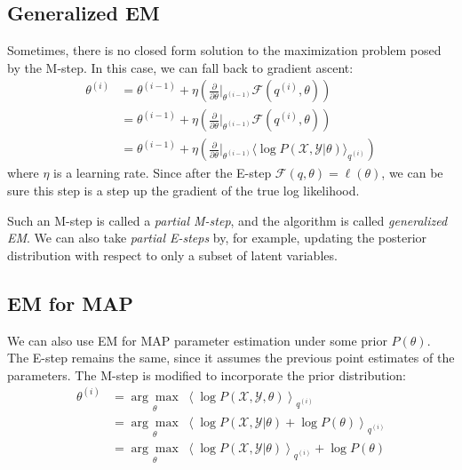 \documentclass[a4paper]{article}
\begin{document}
\subsection{Generalized EM}
Sometimes, there is no closed form solution to the maximization problem posed by the M-step. In this case, we can fall back to gradient ascent:
\begin{align*}
\theta^{(i)} &= \theta^{(i-1)} + \eta\left(\frac{\partial}{\partial \theta}\Bigr|_{\theta^{(i-1)}}\mathcal{F}(q^{(i)},\theta)\right) \\
&= \theta^{(i-1)} + \eta\left(\frac{\partial}{\partial \theta}\Bigr|_{\theta^{(i-1)}}\mathcal{F}(q^{(i)},\theta)\right) \\
&= \theta^{(i-1)} + \eta\left(\frac{\partial}{\partial \theta}\Bigr|_{\theta^{(i-1)}}\langle\log P(\mathcal{X},\mathcal{Y}|\theta)\rangle_{q^{(i)}}\right)
\end{align*}
where $\eta$ is a learning rate. Since after the E-step $\mathcal{F}(q,\theta) = \ell(\theta)$, we can be sure this step is a step up the gradient of the true log likelihood.

Such an M-step is called a \emph{partial M-step}, and the algorithm is called \emph{generalized EM}. We can also take \emph{partial E-steps} by, for example, updating the posterior distribution with respect to only a subset of latent variables.

\subsection{EM for MAP}
We can also use EM for MAP parameter estimation under some prior $P(\theta)$. The E-step remains the same, since it assumes the previous point estimates of the parameters. The M-step is modified to incorporate the prior distribution:
\begin{align*}
\theta^{(i)} &= \underset{\theta}{\arg\max} \; \left\langle\log P(\mathcal{X},\mathcal{Y},\theta)\right\rangle_{q^{(i)}} \\
&= \underset{\theta}{\arg\max} \; \left\langle\log P(\mathcal{X},\mathcal{Y}|\theta) + \log P(\theta)\right\rangle_{q^{(i)}} \\
&= \underset{\theta}{\arg\max} \; \left\langle\log P(\mathcal{X},\mathcal{Y}|\theta)\right\rangle_{q^{(i)}}  + \log P(\theta) \\
\end{align*}


\end{document}
